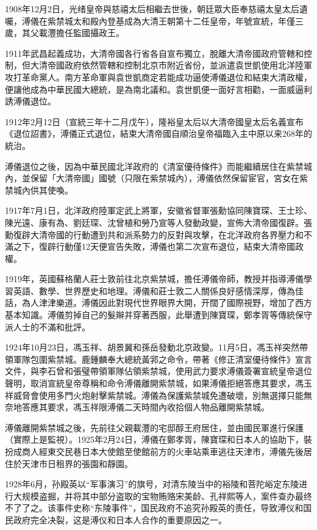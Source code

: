 1908年12月2日，光绪皇帝與慈禧太后相繼去世後，朝廷眾大臣奉慈禧太皇太后遺囑，溥儀在紫禁城太和殿內登基成為大清王朝第十二任皇帝，年號宣統，年僅三歲，其父載灃擔任監國攝政王。

1911年武昌起義成功，大清帝國各行省各自宣布獨立，脫離大清帝國政府管轄和控制，但大清帝國政府依然管轄和控制北京市附近省份，並派遣袁世凱使用北洋陸軍攻打革命黨人。南方革命軍與袁世凱商定若能成功逼使溥儀退位和結束大清政權，便讓他成為中華民國大總統，是為南北議和。袁世凱便一面好言相勸，一面威逼利誘溥儀退位。

1912年2月12日（宣統三年十二月戊午），隆裕皇太后以大清帝國皇太后名義宣布《退位詔書》，溥儀正式退位，結束大清帝國自順治皇帝福臨入主中原以来268年的統治。

溥儀退位之後，因為中華民國北洋政府的《清室優待條件》而能繼續居住在紫禁城內，並保留「大清帝國」國號（只限在紫禁城內），溥儀依然保留宦官，宮女在紫禁城內供其使喚。

1917年7月1日，北洋政府陸軍定武上將軍，安徽省督軍張勳協同陳寶琛、王士珍、陳光遠、康有為、劉廷琛、沈曾植和勞乃宣等人發動政變，宣佈大清帝國復辟。張勳復辟大清帝國的行動遭到共和派系勢力的反對與攻擊，在北洋政府各界壓力和不滿之下，復辟行動僅12天便宣告失敗，溥儀也第二次宣布退位，結束大清帝國政權。

1919年，英國蘇格蘭人莊士敦前往北京紫禁城，擔任溥儀帝師，教授并指導溥儀學習英語、數學、世界歷史和地理。溥儀和莊士敦二人關係良好感情深厚，傳為佳話，為人津津樂道。溥儀因此對現代世界眼界大開，开闊了國際視野，增加了西方基本知識。溥儀剪掉自己的髮辮并穿著西服，此舉遭到陳寶琛，鄭孝胥等傳統保守派人士的不滿和批評。

1924年10月23日，馮玉祥、胡景翼和孫岳發動北京政變。11月5日，馮玉祥突然帶領軍隊包圍紫禁城。鹿鍾麟奉大總統黃郛之命令，帶著《修正清室優待條件》宣言文件，與李石曾和張璧帶領軍隊佔領紫禁城，使用武力要求溥儀簽署宣統皇帝退位聲明，取消宣統皇帝尊稱和命令溥儀離開紫禁城，如果溥儀拒絕答應其要求，馮玉祥威脅會使用多門火炮射擊紫禁城。溥儀為保護紫禁城免遭破壞，別無選擇只能無奈地答應其要求，馮玉祥限溥儀二天時間內收拾個人物品離開紫禁城。

溥儀離開紫禁城之後，先前往父親載灃的宅邸醇王府居住，並由國民軍進行保護（實際上是監視）。1925年2月24日，溥儀在鄭孝胥，陳寶琛和日本人的協助下，裝扮成商人經東交民巷日本大使館至使館前方的火車站乘車逃往天津市，溥儀先後居住於天津市日租界的張園和靜園。

1928年6月，孙殿英以“军事演习”的旗号，对清东陵当中的裕陵和菩陀峪定东陵进行大规模盗掘，并将其中部分盗取的宝物贿赂宋美龄、孔祥熙等人，案件查办最终不了了之。该事件史称“东陵事件”，国民政府不追究孙殿英的责任，导致溥仪和国民政府完全决裂，这是溥仪和日本人合作的重要原因之一。

